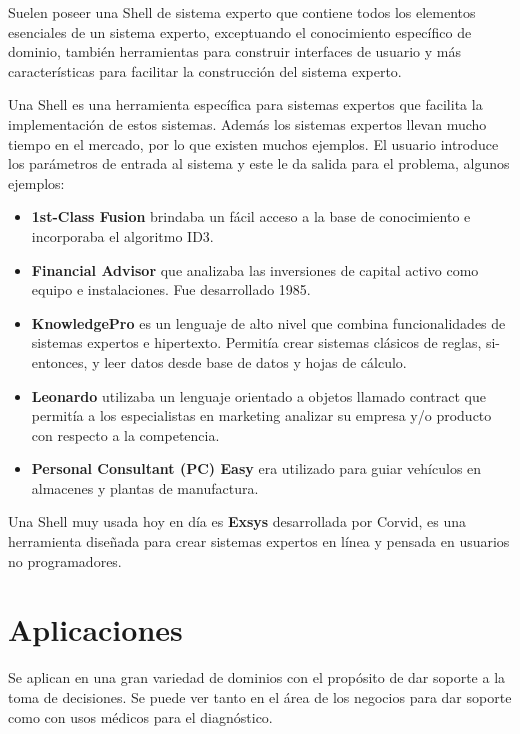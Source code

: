 \documentclass[12pt, twoside, openright]{report} %
\begin{document}
Suelen poseer una Shell de sistema experto que contiene todos los elementos esenciales de un sistema experto, exceptuando el conocimiento específico de dominio, también herramientas para construir interfaces de usuario y más características para facilitar la construcción del sistema experto.

Una Shell es una herramienta específica para sistemas expertos que facilita la implementación de estos sistemas. Además los sistemas expertos llevan mucho tiempo en el mercado, por lo que existen muchos ejemplos. El usuario introduce los parámetros de entrada al sistema y este le da salida para el problema, algunos ejemplos:
\begin{itemize}
	\item \textbf{1st-Class Fusion} brindaba un fácil acceso a la base de conocimiento e incorporaba el algoritmo ID3.
	\item \textbf{Financial Advisor} que analizaba las inversiones de capital activo como equipo e instalaciones. Fue desarrollado 1985.
	\item \textbf{KnowledgePro} es un lenguaje de alto nivel que combina funcionalidades de sistemas expertos e hipertexto. Permitía crear sistemas clásicos de reglas, si-entonces, y leer datos desde base de datos y hojas de cálculo.
	\item \textbf{Leonardo} utilizaba un lenguaje orientado a objetos llamado contract que permitía a los especialistas en marketing analizar su empresa y/o producto con respecto a la competencia.
	\item \textbf{Personal Consultant (PC) Easy} era utilizado para guiar vehículos en almacenes y plantas de manufactura.
\end{itemize}

Una Shell muy usada hoy en día es \textbf{Exsys} desarrollada por Corvid, es una herramienta diseñada para crear sistemas expertos en línea y pensada en usuarios no programadores.
\section{Aplicaciones}
Se aplican en una gran variedad de dominios con el propósito de dar soporte a la toma de decisiones. Se puede ver tanto en el área de los negocios para dar soporte como con usos médicos para el diagnóstico.
\pagebreak
\end{document}
